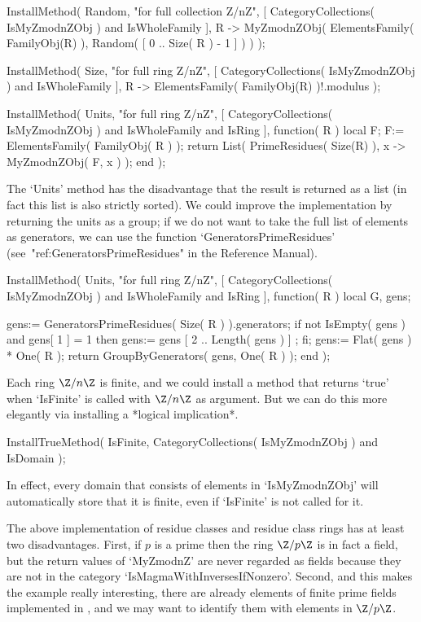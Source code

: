 \begintt
InstallMethod( Random,
    "for full collection Z/nZ",
    [ CategoryCollections( IsMyZmodnZObj ) and IsWholeFamily ],
    R -> MyZmodnZObj( ElementsFamily( FamilyObj(R) ),
                    Random( [ 0 .. Size( R ) - 1 ] ) ) );

InstallMethod( Size,
    "for full ring Z/nZ",
    [ CategoryCollections( IsMyZmodnZObj ) and IsWholeFamily ],
    R -> ElementsFamily( FamilyObj(R) )!.modulus );

InstallMethod( Units,
    "for full ring Z/nZ",
    [     CategoryCollections( IsMyZmodnZObj )
      and IsWholeFamily and IsRing ],
    function( R )
    local F;
    F:= ElementsFamily( FamilyObj( R ) );
    return List( PrimeResidues( Size(R) ), x -> MyZmodnZObj( F, x ) );
    end );
\endtt

The `Units' method has the disadvantage that the result is returned
as a list (in fact this list is also strictly sorted).
We could improve the implementation by returning the units as a group;
if we do not want to take the full list of elements as generators,
we can use the function `GeneratorsPrimeResidues'
(see~"ref:GeneratorsPrimeResidues" in the Reference Manual).

\begintt
InstallMethod( Units,
    "for full ring Z/nZ",
    [     CategoryCollections( IsMyZmodnZObj )
      and IsWholeFamily and IsRing ],
    function( R )
    local G, gens;

    gens:= GeneratorsPrimeResidues( Size( R ) ).generators;
    if not IsEmpty( gens ) and gens[ 1 ] = 1 then
      gens:= gens{ [ 2 .. Length( gens ) ] };
    fi;
    gens:= Flat( gens ) * One( R );
    return GroupByGenerators( gens, One( R ) );
    end );
\endtt

Each ring $\Z/n\Z$ is finite,
and we could install a method that returns `true' when `IsFinite' is
called with $\Z/n\Z$ as argument.
But we can do this more elegantly via installing a *logical implication*.

\begintt
InstallTrueMethod( IsFinite,
    CategoryCollections( IsMyZmodnZObj ) and IsDomain );
\endtt

In effect, every domain that consists of elements in `IsMyZmodnZObj'
will automatically store that it is finite,
even if `IsFinite' is not called for it.



The above implementation of residue classes and residue class rings
has at least two disadvantages.
First, if $p$ is a prime then the ring $\Z/p\Z$ is in fact a field,
but the return values of `MyZmodnZ' are never regarded as fields because
they are not in the category `IsMagmaWithInversesIfNonzero'.
Second, and this makes the example really interesting,
there are already elements of finite prime fields implemented in {\GAP},
and we may want to identify them with elements in $\Z/p\Z$.

